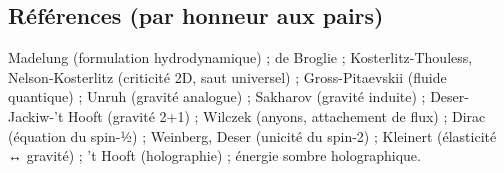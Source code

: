 \documentclass[11pt]{article}
\begin{document}
\hypertarget{ruxe9fuxe9rences-par-honneur-aux-pairs}{%
\subsection{Références (par honneur aux
pairs)}\label{ruxe9fuxe9rences-par-honneur-aux-pairs}}

Madelung (formulation hydrodynamique) ; de Broglie ;
Kosterlitz-Thouless, Nelson-Kosterlitz (criticité 2D, saut universel) ;
Gross-Pitaevskii (fluide quantique) ; Unruh (gravité analogue) ;
Sakharov (gravité induite) ; Deser-Jackiw-'t Hooft (gravité 2+1) ;
Wilczek (anyons, attachement de flux) ; Dirac (équation du spin-½) ;
Weinberg, Deser (unicité du spin-2) ; Kleinert (élasticité ↔ gravité) ;
't Hooft (holographie) ; énergie sombre holographique.
\end{document}
